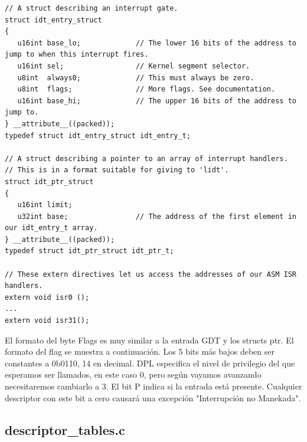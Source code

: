 \documentclass{report}
\begin{document}
\begin{lstlisting}
// A struct describing an interrupt gate.
struct idt_entry_struct
{
   u16int base_lo;             // The lower 16 bits of the address to jump to when this interrupt fires.
   u16int sel;                 // Kernel segment selector.
   u8int  always0;             // This must always be zero.
   u8int  flags;               // More flags. See documentation.
   u16int base_hi;             // The upper 16 bits of the address to jump to.
} __attribute__((packed));
typedef struct idt_entry_struct idt_entry_t;

// A struct describing a pointer to an array of interrupt handlers.
// This is in a format suitable for giving to 'lidt'.
struct idt_ptr_struct
{
   u16int limit;
   u32int base;                // The address of the first element in our idt_entry_t array.
} __attribute__((packed));
typedef struct idt_ptr_struct idt_ptr_t;

// These extern directives let us access the addresses of our ASM ISR handlers.
extern void isr0 ();
...
extern void isr31();
\end{lstlisting}

El formato del byte Flags es muy similar a la entrada GDT y los structs ptr. El formato del flag se muestra a continuación. Los 5 bits más bajos deben ser constantes a 0b0110, 14 en decimal. DPL especifica el nivel de privilegio del que esperamos ser llamados, en este caso 0, pero según vayamos avanzando necesitaremos cambiarlo a 3. El bit P indica si la entrada está presente. Cualquier descriptor con este bit a cero causará una excepción "Interrupción no Manekada".

\subsection{descriptor\_tables.c}
\end{document}
